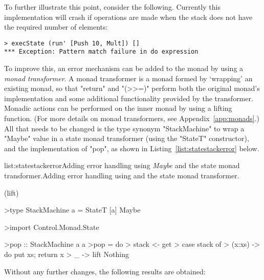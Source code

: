 To further illustrate this point, consider the following. Currently this implementation will crash if operations are made when the stack does not have the required number of elements:

\begin{verbatim}
> execState (run' [Push 10, Mult]) []
*** Exception: Pattern match failure in do expression
\end{verbatim}

\noindent To improve this, an error mechanism can be added to the monad by using a \emph{monad transformer}. A monad transformer is a monad formed by `wrapping' an existing monad, so that "return" and "(>>=)" perform both the original monad's implementation and some additional functionality provided by the transformer. Monadic actions can be performed on the inner monad by using a lifting function. (For more details on monad transformers, see Appendix~\ref{app:monads}.) All that needs to be changed is the type synonym "StackMachine" to wrap a "Maybe" value in a state monad transformer (using the "StateT" constructor), and the implementation of "pop", as shown in Listing~\ref{list:statestackerror} below.

\vspace{-0.5em}
\begin{listing}{list:statestackerror}{Adding error handling using \emph{Maybe} and the state monad transformer.}{Adding error handling using  and the state monad transformer.}{}
\end{listing}\vspace{-1.5em}

\functions(lift)
\begin{haskell}

>type StackMachine a = StateT [a] Maybe

>import Control.Monad.State

>pop :: StackMachine a a
>pop = do
>  stack <- get
>  case stack of
>    (x:xs) -> do put xs; return x
>    _ -> lift Nothing


\end{haskell}
\noindent Without any further changes, the following results are obtained:

